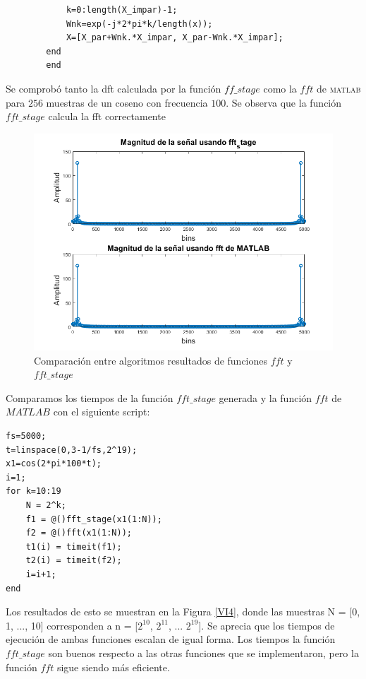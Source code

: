 \documentclass[letterpaper,onecolumn,10pt,journal,final]{IEEEtran}
\begin{document}
\begin{enumerate}[1)]
\begin{lstlisting}
            k=0:length(X_impar)-1;
            Wnk=exp(-j*2*pi*k/length(x));
            X=[X_par+Wnk.*X_impar, X_par-Wnk.*X_impar];
        end
        end
    \end{lstlisting}
    Se comprobó tanto la dft calculada por la función $ff\_stage$ como la $fft$ de \textsc{matlab} para $256$ muestras de un coseno con frecuencia $100$. Se observa que la función $fft\_stage$ calcula la fft correctamente
    \begin{figure}[H]
        \centering
        \includegraphics[width=\linewidth]{Figuras/VI3.png}
        \caption{Comparación entre algoritmos resultados de funciones $fft$ y $fft\_stage$}
        \label{fig:VI3}
    \end{figure}

Comparamos los tiempos de la función $fft\_stage$ generada y la función $fft$ de $MATLAB$ con el siguiente script:

\begin{lstlisting}
fs=5000;
t=linspace(0,3-1/fs,2^19);
x1=cos(2*pi*100*t);
i=1;
for k=10:19
    N = 2^k;
    f1 = @()fft_stage(x1(1:N));
    f2 = @()fft(x1(1:N));
    t1(i) = timeit(f1);
    t2(i) = timeit(f2);
    i=i+1;
end
\end{lstlisting}

Los resultados de esto se muestran en la Figura \ref{VI4}, donde las muestras N = [0, 1, ..., 10] corresponden a n = [$2^{10}$, $2^{11}$, ... $2^{19}$]. Se aprecia que los tiempos de ejecución de ambas funciones escalan de igual forma. Los tiempos la función $fft\_stage$ son buenos respecto a las otras funciones que se implementaron, pero la función $fft$ sigue siendo más eficiente.


\end{enumerate}
\end{document}
